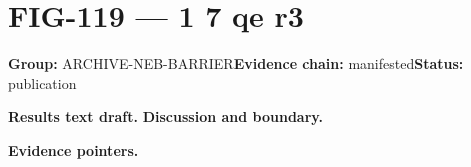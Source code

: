 \clearpage
\section{FIG-119 --- 1 7 qe r3}
\label{figpage:fig-119}
\textbf{Group:} ARCHIVE-NEB-BARRIER\quad \textbf{Evidence chain:} manifested\quad \textbf{Status:} publication

\textbf{Results text draft.} 
\textbf{Discussion and boundary.} 


\textbf{Evidence pointers.}



\vfill
